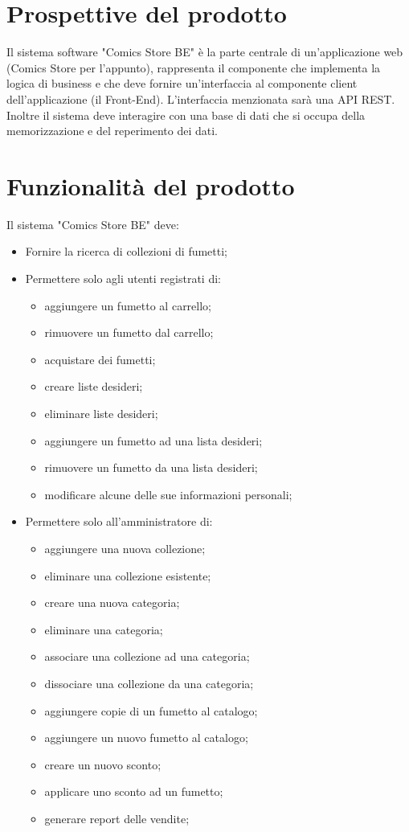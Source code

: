 \documentclass{scrreprt}
\begin{document}
\section{Prospettive del prodotto}
Il sistema software "Comics Store BE" è la parte centrale di un'applicazione web (Comics Store per l'appunto),
rappresenta il componente che implementa la logica di business e che deve fornire un'interfaccia al componente client
dell'applicazione (il Front-End). L'interfaccia menzionata sarà una API REST.
Inoltre il sistema deve interagire con una base di dati che si occupa della memorizzazione e del reperimento dei dati.

\section{Funzionalità del prodotto}
Il sistema "Comics Store BE" deve:
\begin{itemize}
    \item Fornire la ricerca di collezioni di fumetti;
    \item Permettere solo agli utenti registrati di:
          \begin{itemize}
              \item aggiungere un fumetto al carrello;
              \item rimuovere un fumetto dal carrello;
              \item acquistare dei fumetti;
              \item creare liste desideri;
              \item eliminare liste desideri;
              \item aggiungere un fumetto ad una lista desideri;
              \item rimuovere un fumetto da una lista desideri;
              \item modificare alcune delle sue informazioni personali;
          \end{itemize}
    \item Permettere solo all'amministratore di:
          \begin{itemize}
              \item aggiungere una nuova collezione;
              \item eliminare una collezione esistente;
              \item creare una nuova categoria;
              \item eliminare una categoria;
              \item associare una collezione ad una categoria;
              \item dissociare una collezione da una categoria;
              \item aggiungere copie di un fumetto al catalogo;
              \item aggiungere un nuovo fumetto al catalogo;
              \item creare un nuovo sconto;
              \item applicare uno sconto ad un fumetto;
              \item generare report delle vendite;
          \end{itemize}
\end{itemize}
\end{document}
